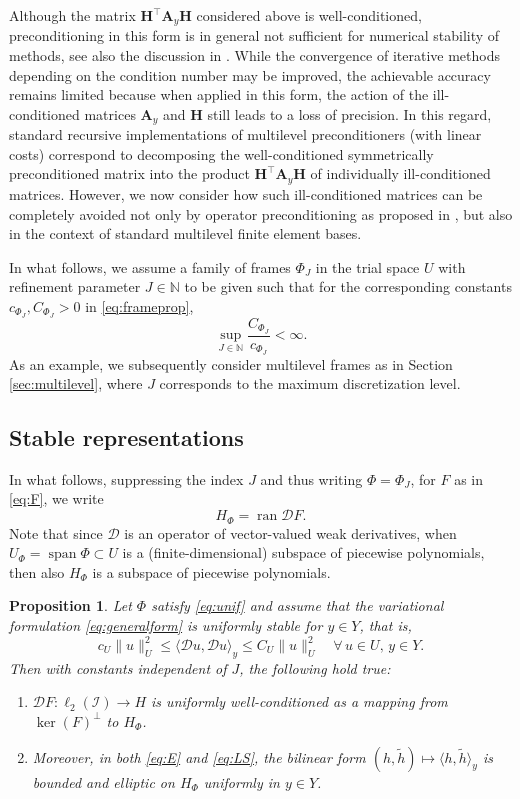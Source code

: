 \documentclass[a4paper,11pt]{amsart}
\DeclareMathOperator{\ran}{ran}
\DeclareMathOperator{\linspan}{span}
\numberwithin{equation}{section}
\newtheorem{prop}[theorem]{Proposition}
\theoremstyle{definition}
\theoremstyle{remark}
\theoremstyle{plain}
\newcommand{\N}{\mathbb{N}}
\begin{document}
Although the matrix $\mathbf H^\intercal \mathbf A_y \mathbf H$ considered above is well-conditioned, preconditioning in this form is in general not sufficient for numerical stability of methods, see also the discussion in \cite{MR4839137}. While the convergence of iterative methods depending on the condition number may be improved, the achievable accuracy remains limited because when applied in this form, the action of the ill-conditioned matrices $\mathbf A_y$ and $\mathbf H$ still leads to a loss of precision.
In this regard, standard recursive implementations of multilevel preconditioners (with linear costs) correspond to decomposing the well-conditioned symmetrically preconditioned matrix into the product $\mathbf H^\intercal \mathbf A_y \mathbf H$ of individually ill-conditioned matrices.
However, we now consider how such ill-conditioned matrices can be completely avoided not only by operator preconditioning as proposed in \cite{MR4839137}, but also in the context of standard multilevel finite element bases.

In what follows, we assume a family of frames $\Phi_J$ in the trial space $U$ with refinement parameter $J \in \N$ to be given such that for the corresponding constants $c_{\Phi_J} , C_{\Phi_J} >0$ in \eqref{eq:frameprop}, 
\begin{equation}\label{eq:unif}
  \sup_{J \in \N} \frac{C_{\Phi_J}}{c_{\Phi_J}} < \infty.
\end{equation}
As an example, we subsequently consider multilevel frames as in Section \ref{sec:multilevel}, where $J$ corresponds to the maximum discretization level.

\subsection{Stable representations}

In what follows, suppressing the index $J$ and thus writing $\Phi = \Phi_J$, for 
$F$ as in \eqref{eq:F}, we write
 \[ 
  H_\Phi = \ran \mathcal{D}F. 
  \]
Note that since $\mathcal D$ is an operator of vector-valued weak derivatives, when $U_\Phi = \linspan \Phi \subset U$ is a (finite-dimensional) subspace of piecewise polynomials, then also $H_\Phi$ is a subspace of piecewise polynomials. 
%

\begin{prop}
\label{prop:stab}
Let $\Phi$ satisfy \eqref{eq:unif} and assume that the variational formulation \eqref{eq:generalform} is uniformly stable for $y\in Y$, that is,
 \[
 c_U\|u\|^2_{U}\leq \langle \mathcal Du,\mathcal Du\rangle_y	\leq C_U\|u\|^2_{U}\quad  \forall \,u\in U, \,y\in Y.
 \]
 Then with constants independent of $J$, the following hold true:
\begin{enumerate}[\rm(i)]
\item $\mathcal{D} F  \colon \ell_2(\mathcal{I}) \to  H$
 is uniformly well-conditioned as a mapping from $\ker ( F )^\bot$ to $H_\Phi$.
 \item Moreover, in both \eqref{eq:E} and \eqref{eq:LS}, the bilinear form $(h, \tilde h) \mapsto \langle h, \tilde h\rangle_y$ is bounded and elliptic on $H_\Phi$ uniformly in $y \in Y$.
\end{enumerate}
 \end{prop}
\end{document}
